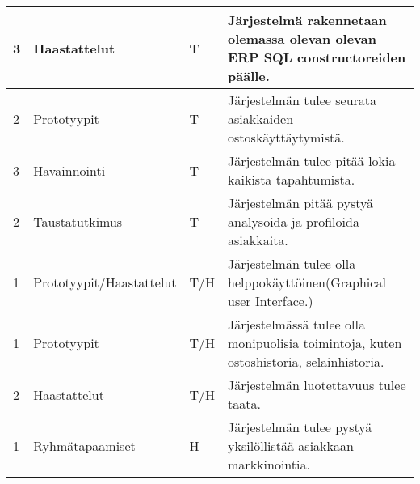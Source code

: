 \begin{landscape}
\begin{table}[]
{\begin{tabular}{llll}
    \multicolumn{1}{|l|}{3}                                            & \multicolumn{1}{l|}{Haastattelut}                                      & \multicolumn{1}{l|}{T}                                      & \multicolumn{1}{l|}{Järjestelmä rakennetaan olemassa olevan olevan ERP SQL constructoreiden päälle.}          \\ \hline
    \multicolumn{1}{|l|}{2}                                            & \multicolumn{1}{l|}{Prototyypit}                                      & \multicolumn{1}{l|}{T}                                      & \multicolumn{1}{l|}{Järjestelmän tulee seurata asiakkaiden ostoskäyttäytymistä.}                              \\ \hline
    \multicolumn{1}{|l|}{3}                                            & \multicolumn{1}{l|}{Havainnointi}                                      & \multicolumn{1}{l|}{T}                                      & \multicolumn{1}{l|}{Järjestelmän tulee pitää lokia kaikista tapahtumista.}                                   \\ \hline
    \multicolumn{1}{|l|}{2}                                            & \multicolumn{1}{l|}{Taustatutkimus}                                      & \multicolumn{1}{l|}{T}                                      & \multicolumn{1}{l|}{Järjestelmän pitää pystyä analysoida ja profiloida asiakkaita.}                         \\ \hline
    \multicolumn{1}{|l|}{1}                                            & \multicolumn{1}{l|}{Prototyypit/Haastattelut}                                      & \multicolumn{1}{l|}{T/H}                                    & \multicolumn{1}{l|}{Järjestelmän tulee olla helppokäyttöinen(Graphical user Interface.)}                    \\ \hline
    \multicolumn{1}{|l|}{1}                                            & \multicolumn{1}{l|}{Prototyypit}                                      & \multicolumn{1}{l|}{T/H}                                    & \multicolumn{1}{l|}{Järjestelmässä tulee olla monipuolisia toimintoja, kuten ostoshistoria, selainhistoria.}\\ \hline
    \multicolumn{1}{|l|}{2}                                            & \multicolumn{1}{l|}{Haastattelut}                                      & \multicolumn{1}{l|}{T/H}                                    & \multicolumn{1}{l|}{Järjestelmän luotettavuus tulee taata.}                                                 \\ \hline
    \multicolumn{1}{|l|}{1}                                            & \multicolumn{1}{l|}{Ryhmätapaamiset}                                      & \multicolumn{1}{l|}{H}                                    & \multicolumn{1}{l|}{Järjestelmän tulee pystyä yksilöllistää asiakkaan markkinointia.}                       \\ \hline

\end{tabular}}
\end{table}
\end{landscape}
